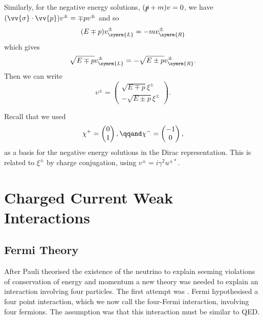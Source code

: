 \documentclass[fleqn]{NotesClass}
\newcommand{\Left}{\symrm{L}}
\newcommand{\Right}{\symrm{R}}
\begin{document}
    Similarly, for the negative energy solutions, \((\slashed{p} + m)v = 0\), we have \((\vv{\sigma} \cdot \vv{p})v^{\pm} = \mp pv^{\pm}\) and so
    \begin{equation}
        (E \mp p)v_{\Left}^{\pm} = -mv_{\Right}^{\pm}
    \end{equation}
    which gives
    \begin{equation}
        \sqrt{E \mp p}v_{\Left}^{\pm} = -\sqrt{E \pm p}v_{\Right}^{\pm}.
    \end{equation}
    Then we can write
    \begin{equation}
        v^{\pm} = 
        \begin{pmatrix}
            \sqrt{E \mp p}\xi^{\pm}\\
            -\sqrt{E \pm p}\xi^{\pm}
        \end{pmatrix}
        .
    \end{equation}
    
    Recall that we used
    \begin{equation}
        \chi^{+} =
        \begin{pmatrix}
            0\\ 1
        \end{pmatrix}
        , \qqand \chi^{-} = 
        \begin{pmatrix}
            -1\\ 0
        \end{pmatrix}
        ,
    \end{equation}
    as a basis for the negative energy solutions in the Dirac representation.
    This is related to \(\xi^{\pm}\) by charge conjugation, using \(v^{\pm} = i\gamma^2 u^{\pm *}\).
   
    \chapter{Charged Current Weak Interactions}
    \section{Fermi Theory}
    After Pauli theorised the existence of the neutrino to explain seeming violations of conservation of energy and momentum a new theory was needed to explain an interaction involving four particles.
    The first attempt was .
    Fermi hypothesised a four point interaction, which we now call the four-Fermi interaction, involving four fermions.
    The assumption was that this interaction must be similar to QED.
   
\end{document}

